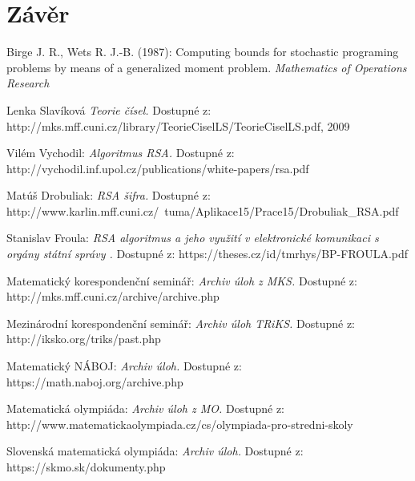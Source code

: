 \documentclass[12pt,a4paper]{report}
\begin{document}
\chapter{Závěr}


\begin{thebibliography}{99}

\bibitem{}
Birge J. R., Wets R. J.-B. (1987): Computing bounds for stochastic programing problems by means of a generalized moment problem. \textit{Mathematics of Operations Research}

\bibitem{}
Lenka Slavíková \textit{Teorie čísel.} Dostupné z: http://mks.mff.cuni.cz/library/Teorie\break CiselLS/TeorieCiselLS.pdf, 2009

\bibitem{}
Vilém Vychodil: \textit{Algoritmus RSA.} Dostupné z: http://vychodil.inf.upol.cz\break/publications/white-papers/rsa.pdf 

\bibitem{}
Matúš Drobuliak: \textit{RSA šifra.} Dostupné z: http://www.karlin.mff.cuni.cz/~tuma\break/Aplikace15/Prace15/Drobuliak\_RSA.pdf

\bibitem{}
Stanislav Froula: \textit{RSA algoritmus a jeho využití
v elektronické komunikaci s orgány
státní správy
.} Dostupné z: https://theses.cz/id/tmrhys/BP-FROULA.pdf

\bibitem{}
Matematický korespondenční seminář: \textit{Archiv úloh z MKS.} Dostupné z: http://mks.mff.cuni.cz/archive/archive.php

\bibitem{}
Mezinárodní korespondenční seminář: \textit{Archiv úloh TRiKS.} Dostupné z: http://iksko.org/triks/past.php 

\bibitem{}
Matematický NÁBOJ: \textit{Archiv úloh.} Dostupné z: https://math.naboj.org/archive.php

\bibitem{}
Matematická olympiáda: \textit{Archiv úloh z MO.} Dostupné z: http://www.matematickaolympiada.cz/cs/olympiada-pro-stredni-skoly

\bibitem{}
Slovenská matematická olympiáda: \textit{Archiv úloh.} Dostupné z: https://skmo.sk/dokumenty.php
\end{thebibliography}


\openright
\end{document}
